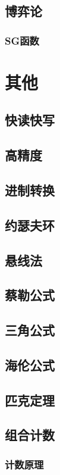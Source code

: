 \documentclass[twocolumn,a4]{article}
\newcommand{\addcpp}[1]{}
\begin{document}
	\subsection{博弈论}
		\subsubsection{SG函数}
			\addcpp{math/SG}

\section{其他}
	\subsection{快读快写}
		\addcpp{other/fast_io}
	\subsection{高精度}
		\addcpp{other/big_num}
	\subsection{进制转换}
		\addcpp{other/base}
	\subsection{约瑟夫环}
	\subsection{悬线法}
	\subsection{蔡勒公式}
	\subsection{三角公式}
	\subsection{海伦公式}
	\subsection{匹克定理}
	\subsection{组合计数}
		\subsubsection{计数原理}
\end{document}
